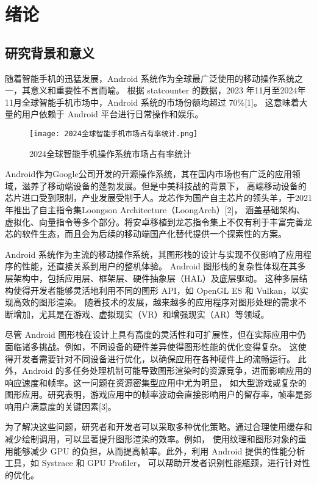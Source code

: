 
\chapter{绪论}

\section{研究背景和意义}

随着智能手机的迅猛发展，Android 系统作为全球最广泛使用的移动操作系统之一，其意义和重要性不言而喻。
根据 statcounter 的数据，2023 年11月至2024年11月全球智能手机市场中，Android 系统的市场份额均超过 70\%[1]。
这意味着大量的用户依赖于 Android 平台进行日常操作和娱乐。
\begin{figure}[h]
    \centering
    \texttt{[image: 2024全球智能手机市场占有率统计.png]}
    \caption{2024全球智能手机操作系统市场占有率统计}
  \end{figure}
Android作为Google公司开发的开源操作系统，其在国内市场也有广泛的应用领域，滋养了移动端设备的蓬勃发展。但是中美科技战的背景下，
高端移动设备的芯片进口受到限制，产业发展受制于人。龙芯作为国产自主芯片的领头羊，于2021年推出了自主指令集Loongson Architecture（LoongArch）[2]，
涵盖基础架构、虚拟化、向量指令等多个部分。将安卓移植到龙芯指令集上不仅有利于丰富完善龙芯的软件生态，而且会为后续的移动端国产化替代提供一个探索性的方案。

Android 系统作为主流的移动操作系统，其图形栈的设计与实现不仅影响了应用程序的性能，还直接关系到用户的整机体验。
Android 图形栈的复杂性体现在其多层架构中，包括应用层、框架层、硬件抽象层（HAL）及底层驱动。
这种多层结构使得开发者能够灵活地利用不同的图形 API，如 OpenGL ES 和 Vulkan，以实现高效的图形渲染。
随着技术的发展，越来越多的应用程序对图形处理的需求不断增加，尤其是在游戏、虚拟现实（VR）和增强现实（AR）等领域。

尽管 Android 图形栈在设计上具有高度的灵活性和可扩展性，但在实际应用中仍面临诸多挑战。例如，不同设备的硬件差异使得图形性能的优化变得复杂。
这使得开发者需要针对不同设备进行优化，以确保应用在各种硬件上的流畅运行。
此外，Android 的多任务处理机制可能导致图形渲染时的资源竞争，进而影响应用的响应速度和帧率。这一问题在资源密集型应用中尤为明显，
如大型游戏或复杂的图形应用。研究表明，游戏应用中的帧率波动会直接影响用户的留存率，帧率是影响用户满意度的关键因素[3]。

为了解决这些问题，研究者和开发者可以采取多种优化策略。通过合理使用缓存和减少绘制调用，可以显著提升图形渲染的效率。例如，
使用纹理和图形对象的重用能够减少 GPU 的负担，从而提高帧率。此外，利用 Android 提供的性能分析工具，如 Systrace 和 GPU Profiler，
可以帮助开发者识别性能瓶颈，进行针对性的优化。

